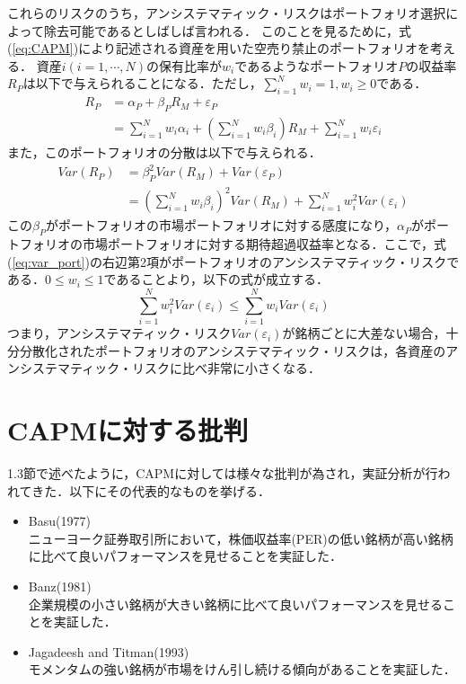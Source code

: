﻿\documentclass[11pt]{jreport}
\begin{document}
これらのリスクのうち，アンシステマティック・リスクはポートフォリオ選択によって除去可能であるとしばしば言われる．
このことを見るために，式(\ref{eq:CAPM})により記述される資産を用いた空売り禁止のポートフォリオを考える．
資産$i(i=1,\cdots,N)$の保有比率が$w_i$であるようなポートフォリオ$P$の収益率$R_P$は以下で与えられることになる．ただし，$\sum_{i=1}^N w_i = 1, w_i\geq0$である．
\begin{equation}
\begin{split}
R_P &= \alpha_P + \beta_PR_M + \varepsilon_P\\
&= \sum_{i=1}^N w_i\alpha_i
+\left(\sum_{i=1}^N w_i\beta_i\right)R_M
+\sum_{i=1}^N w_i\varepsilon_i
\end{split}
\end{equation}
また，このポートフォリオの分散は以下で与えられる．
\begin{equation}
\begin{split}
Var(R_P) &= \beta_P^2 Var(R_M) + Var(\varepsilon_P)\\
& = \left(\sum_{i=1}^N w_i\beta_i\right)^2Var(R_M) + \sum_{i=1}^N w_i^2 Var(\varepsilon_i)
\label{eq:var_port}
\end{split}
\end{equation}
この$\beta_P$がポートフォリオの市場ポートフォリオに対する感度になり，$\alpha_P$がポートフォリオの市場ポートフォリオに対する期待超過収益率となる．ここで，式(\ref{eq:var_port})の右辺第2項がポートフォリオのアンシステマティック・リスクである．$0\leq w_i \leq 1$であることより，以下の式が成立する．
\begin{equation}
\sum_{i=1}^N w_i^2Var(\varepsilon_i) \leq \sum_{i=1}^N w_iVar(\varepsilon_i)
\end{equation}
つまり，アンシステマティック・リスク$Var(\varepsilon_i)$が銘柄ごとに大差ない場合，十分分散化されたポートフォリオのアンシステマティック・リスクは，各資産のアンシステマティック・リスクに比べ非常に小さくなる．



\section{CAPMに対する批判}
1.3節で述べたように，CAPMに対しては様々な批判が為され，実証分析が行われてきた．以下にその代表的なものを挙げる．
\begin{itemize}
\item Basu(1977)\cite{Basu}\\
ニューヨーク証券取引所において，株価収益率(PER)の低い銘柄が高い銘柄に比べて良いパフォーマンスを見せることを実証した．
\item Banz(1981)\cite{Banz}\\
企業規模の小さい銘柄が大きい銘柄に比べて良いパフォーマンスを見せることを実証した．
\item Jagadeesh and Titman(1993)\cite{Jagadeesh}\\
モメンタムの強い銘柄が市場をけん引し続ける傾向があることを実証した．
\end{itemize}
\end{document}
